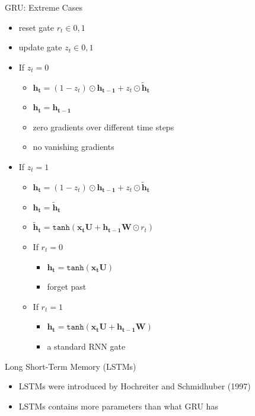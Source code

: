\begin{frame}{GRU: Extreme Cases}
    \centering
    \begin{itemize}
        \item reset gate $r_t \in {0,1}$
        \item update gate $z_t \in {0,1}$
        \item If $z_t = 0$
        \begin{itemize}
            \item $\bm{h_t} = (1-z_t) \odot \bm{h_{t-1}} + z_t \odot \bm{\tilde{h}_t}$ 
            \item $\bm{h_t} = \bm{h_{t-1}}$
            \item zero gradients over different time steps 
            \item no vanishing gradients
        \end{itemize}
        \item If $z_t =1$
        \begin{itemize}
            \item $\bm{h_t} = (1-z_t) \odot \bm{h_{t-1}} + z_t \odot \bm{\tilde{h}_t}$ 
            \item $\bm{h_t} = \bm{\tilde{h}_t}$
            \item  $\bm{\tilde{h}_t} = \texttt{tanh} ( \bm{x_t} \bm{U} + \bm{h_{t-1}} \bm{W} \odot r_t)$ 
            \item If $r_t=0$
            \begin{itemize}
                \item $\bm{h_t} = \texttt{tanh}(\bm{x_tU})$ 
                \item forget past
            \end{itemize}
            \item If $r_t =1$
                \begin{itemize}
                    \item $\bm{h_t} = \texttt{tanh} ( \bm{x_t} \bm{U} + \bm{h_{t-1}} \bm{W}) $
                    \item a standard RNN gate
                \end{itemize}
        \end{itemize}
    \end{itemize}
\end{frame}

\begin{frame}{Long Short-Term Memory (LSTMs)}
\begin{itemize}
    \item LSTMs were introduced by Hochreiter and Schmidhuber (1997)
    \item LSTMs contains more parameters than what GRU has
\end{itemize}
\end{frame}

